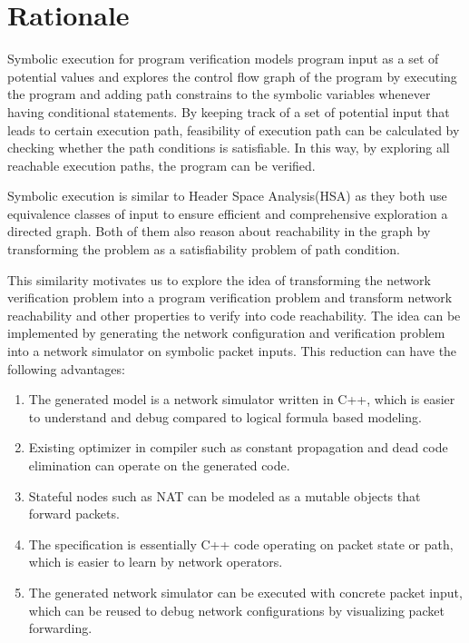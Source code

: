 \documentclass[letterpaper, 10 pt, conference]{ieeeconf}  %
\begin{document}
\section{Rationale}\label{sec:rationale}

Symbolic execution for program verification models program input as a set of potential values and explores the control flow graph of the program by executing the program and adding path constrains to the symbolic variables whenever having conditional statements. By keeping track of a set of potential input that leads to certain execution path, feasibility of  execution path can be calculated by checking whether the path conditions is satisfiable. In this way, by exploring all reachable execution paths, the program can be verified.

Symbolic execution is similar to Header Space Analysis(HSA) as they both use equivalence classes of input to ensure efficient and comprehensive exploration a directed graph. Both of them also reason about reachability in the graph by transforming the problem as a satisfiability problem of path condition.

This similarity motivates us to explore the idea of transforming the network verification problem into a program verification problem and transform network reachability and other properties to verify into code reachability. The idea can be implemented by generating the network configuration and verification problem into a network simulator on symbolic packet inputs. This reduction can have the following advantages:

\begin{enumerate}
	\item The generated model is a network simulator written in C++, which is easier to understand and debug compared to logical formula based modeling.
	\item Existing optimizer in compiler such as constant propagation and dead code elimination can operate on the generated code.
	\item Stateful nodes such as NAT can be modeled as a mutable objects that forward packets.
	\item The specification is essentially C++ code operating on packet state or path, which is easier to learn by network operators.
	\item The generated network simulator can be executed with concrete packet input, which can be reused to debug network configurations by visualizing packet forwarding.
\end{enumerate}
\end{document}
